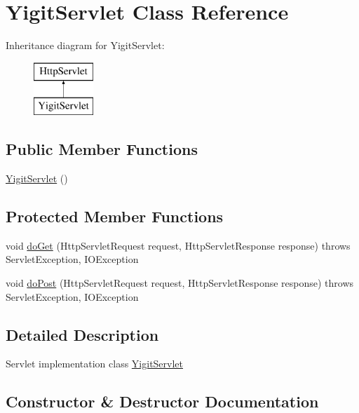 \hypertarget{class_yigit_servlet}{}\section{Yigit\+Servlet Class Reference}
\label{class_yigit_servlet}
Inheritance diagram for Yigit\+Servlet\+:\begin{figure}[H]
\begin{center}
\leavevmode
\includegraphics[height=2.000000cm]{class_yigit_servlet}
\end{center}
\end{figure}
\subsection*{Public Member Functions}
\begin{DoxyCompactItemize}
\item 
\hyperlink{class_yigit_servlet_a2cf35716343b40ed5d31bc20bd0e4281}{Yigit\+Servlet} ()
\end{DoxyCompactItemize}
\subsection*{Protected Member Functions}
\begin{DoxyCompactItemize}
\item 
void \hyperlink{class_yigit_servlet_a87f5660fd804020140513bfd608a1fad}{do\+Get} (Http\+Servlet\+Request request, Http\+Servlet\+Response response)  throws Servlet\+Exception, I\+O\+Exception 
\item 
void \hyperlink{class_yigit_servlet_a6b23eda49b2fe7abb63786c20fe01d75}{do\+Post} (Http\+Servlet\+Request request, Http\+Servlet\+Response response)  throws Servlet\+Exception, I\+O\+Exception 
\end{DoxyCompactItemize}


\subsection{Detailed Description}
Servlet implementation class \hyperlink{class_yigit_servlet}{Yigit\+Servlet} 

\subsection{Constructor \& Destructor Documentation}
\hypertarget{class_yigit_servlet_a2cf35716343b40ed5d31bc20bd0e4281}{}
